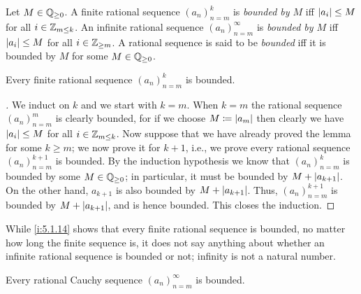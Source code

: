 \begin{defn}\label{i:5.1.12}
  Let \(M \in \mathbb{Q}_{\geq 0}\).
  A finite rational sequence \((a_n)_{n = m}^k\) is \emph{bounded by \(M\)} iff \(\left\lvert a_i\right\rvert \leq M\) for all \(i \in \mathbb{Z}_{m \leq k}\).
  An infinite rational sequence \((a_n)_{n = m}^{\infty}\) is \emph{bounded by \(M\)} iff \(\left\lvert a_i\right\rvert \leq M\) for all \(i \in \mathbb{Z}_{\geq m}\).
  A rational sequence is said to be \emph{bounded} iff it is bounded by \(M\) for some \(M \in \mathbb{Q}_{\geq 0}\).
\end{defn}

\setcounter{thm}{13}
\begin{lem}\label{i:5.1.14}
  Every finite rational sequence \((a_n)_{n = m}^k\) is bounded.
\end{lem}

\begin{proof}[]
  We induct on \(k\) and we start with \(k = m\).
  When \(k = m\) the rational sequence \((a_n)_{n = m}^m\) is clearly bounded, for if we choose \(M \coloneqq \left\lvert a_m\right\rvert\) then clearly we have \(\left\lvert a_i\right\rvert \leq M\) for all \(i \in \mathbb{Z}_{m \leq k}\).
  Now suppose that we have already proved the lemma for some \(k \geq m\);
  we now prove it for \(k + 1\), i.e., we prove every rational sequence \((a_n)_{n = m}^{k + 1}\) is bounded.
  By the induction hypothesis we know that \((a_n)_{n = m}^k\) is bounded by some \(M \in \mathbb{Q}_{\geq 0}\);
  in particular, it must be bounded by \(M + \left\lvert a_{k + 1}\right\rvert\).
  On the other hand, \(a_{k + 1}\) is also bounded by \(M + \left\lvert a_{k + 1}\right\rvert\).
  Thus, \((a_n)_{n = m}^{k + 1}\) is bounded by \(M + \left\lvert a_{k + 1}\right\rvert\), and is hence bounded.
  This closes the induction.
\end{proof}

\begin{note}
  While \cref{i:5.1.14} shows that every finite rational sequence is bounded, no matter how long the finite sequence is, it does not say anything about whether an infinite rational sequence is bounded or not;
  infinity is not a natural number.
\end{note}

\begin{lem}\label{i:5.1.15}
  Every rational Cauchy sequence \((a_n)_{n = m}^{\infty}\) is bounded.
\end{lem}

